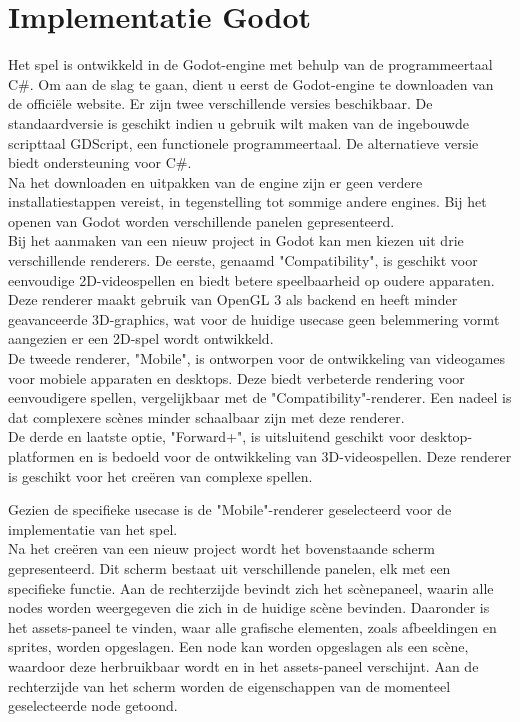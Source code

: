 \section{Implementatie Godot}
Het spel is ontwikkeld in de Godot-engine met behulp van de programmeertaal C\#. Om aan de slag te gaan, dient u eerst de Godot-engine te downloaden van de officiële website. Er zijn twee verschillende versies beschikbaar. De standaardversie is geschikt indien u gebruik wilt maken van de ingebouwde scripttaal GDScript, een functionele programmeertaal. De alternatieve versie biedt ondersteuning voor C\#.
\\
Na het downloaden en uitpakken van de engine zijn er geen verdere installatiestappen vereist, in tegenstelling tot sommige andere engines. Bij het openen van Godot worden verschillende panelen gepresenteerd.
\\
Bij het aanmaken van een nieuw project in Godot kan men kiezen uit drie verschillende renderers. De eerste, genaamd "Compatibility", is geschikt voor eenvoudige 2D-videospellen en biedt betere speelbaarheid op oudere apparaten. Deze renderer maakt gebruik van OpenGL 3 als backend en heeft minder geavanceerde 3D-graphics, wat voor de huidige usecase geen belemmering vormt aangezien er een 2D-spel wordt ontwikkeld.
\\
De tweede renderer, "Mobile", is ontworpen voor de ontwikkeling van videogames voor mobiele apparaten en desktops. Deze biedt verbeterde rendering voor eenvoudigere spellen, vergelijkbaar met de "Compatibility"-renderer. Een nadeel is dat complexere scènes minder schaalbaar zijn met deze renderer.
\\
De derde en laatste optie, "Forward+", is uitsluitend geschikt voor desktop-platformen en is bedoeld voor de ontwikkeling van 3D-videospellen. Deze renderer is geschikt voor het creëren van complexe spellen.

Gezien de specifieke usecase is de "Mobile"-renderer geselecteerd voor de implementatie van het spel.
\\
Na het creëren van een nieuw project wordt het bovenstaande scherm gepresenteerd. Dit scherm bestaat uit verschillende panelen, elk met een specifieke functie. Aan de rechterzijde bevindt zich het scènepaneel, waarin alle nodes worden weergegeven die zich in de huidige scène bevinden. Daaronder is het assets-paneel te vinden, waar alle grafische elementen, zoals afbeeldingen en sprites, worden opgeslagen. Een node kan worden opgeslagen als een scène, waardoor deze herbruikbaar wordt en in het assets-paneel verschijnt. Aan de rechterzijde van het scherm worden de eigenschappen van de momenteel geselecteerde node getoond.
